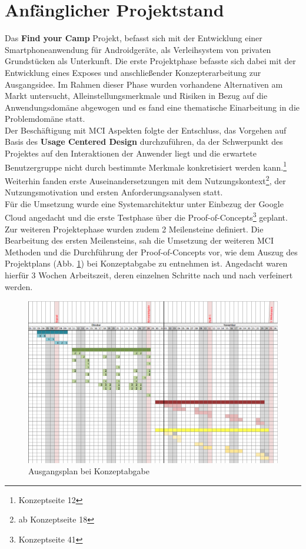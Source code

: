 
\section{Anfänglicher Projektstand}
Das \textbf{Find your Camp} Projekt, befasst sich mit der Entwicklung einer Smartphoneanwendung für Androidgeräte, als Verleihsystem von privaten Grundstücken als Unterkunft. Die erste Projektphase befasste sich dabei mit der Entwicklung eines Exposes und anschließender Konzepterarbeitung zur Ausgangsidee. Im Rahmen dieser Phase wurden vorhandene Alternativen am Markt untersucht, Alleinstellungsmerkmale und Risiken in Bezug auf die Anwendungsdomäne abgewogen und es fand eine thematische Einarbeitung in die Problemdomäne statt.\\
Der Beschäftigung mit MCI Aspekten folgte der Entschluss, das Vorgehen auf Basis des \textbf{Usage Centered Design} durchzuführen, da der Schwerpunkt des Projektes auf den Interaktionen der Anwender liegt und die erwartete Benutzergruppe nicht durch bestimmte Merkmale konkretisiert werden kann.\footnote{Konzeptseite 12}
Weiterhin fanden erste Auseinandersetzungen mit dem Nutzungskontext\footnote{ab Konzeptseite 18}, der Nutzungsmotivation und ersten Anforderungsanalysen statt.\\
Für die Umsetzung wurde eine Systemarchitektur unter Einbezug der Google Cloud angedacht und die erste Testphase über die Proof-of-Concepts\footnote{Konzeptseite 41} geplant.\\

Zur weiteren Projektephase wurden zudem 2 Meilensteine definiert. Die Bearbeitung des ersten Meilensteins, sah die Umsetzung der weiteren MCI Methoden und die Durchführung der Proof-of-Concepts vor, wie dem Auszug des Projektplans (Abb. \ref{fig:projektplan}) bei Konzeptabgabe zu entnehmen ist. Angedacht waren hierfür 3 Wochen Arbeitszeit, deren einzelnen Schritte nach und nach verfeinert werden.
\begin{figure}[H]
\includegraphics[width=1\textwidth]{./images/ausgangsplan.png}
\caption{Ausgangsplan bei Konzeptabgabe}
\label{fig:projektplan}
\end{figure}

